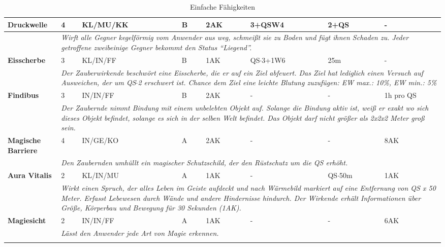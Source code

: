 \begin{longtable}{|p{4cm}|p{0.8cm}|p{2.2cm}|p{0.8cm}|p{0.8cm}|p{2.2cm}|p{0.8cm}|p{2.5cm}|}
\hline
\textbf{Druckwelle} & 4 & KL/MU/KK & B & 2AK & 3+QSW4 & 2+QS & - \\ \hline
\multicolumn{1}{r}{} & \multicolumn{7}{|p{13cm}|}{\textit{Wirft alle Gegner kegelförmig vom Anwender aus weg, schmeißt sie zu Boden und fügt ihnen Schaden zu. Jeder getroffene zweibeinige Gegner bekommt den Status "`Liegend"'.}} \\

\hline
\textbf{Eisscherbe} & 3 & KL/IN/FF & B & 1AK & QS$\cdot$3+1W6 & 25m & - \\ \hline
\multicolumn{1}{r}{} & \multicolumn{7}{|p{13cm}|}{\textit{Der Zauberwirkende beschwört eine Eisscherbe, die er auf ein Ziel abfeuert. Das Ziel hat lediglich einen Versuch auf Ausweichen, der um QS$\cdot$2 erschwert ist. Chance dem Ziel eine leichte Blutung zuzufügen: EW max.: 10\%, EW min.: 5\%}} \\

\hline
\textbf{Findibus} & 3 & IN/IN/FF & B & 2AK & - & - & 1h pro QS \\ \hline
\multicolumn{1}{r}{} & \multicolumn{7}{|p{13cm}|}{\textit{Der Zaubernde nimmt Bindung mit einem unbelebten Objekt auf. Solange die Bindung aktiv ist, weiß er exakt wo sich dieses Objekt befindet, solange es sich in der selben Welt befindet. Das Objekt darf nicht größer als 2x2x2 Meter groß sein.}} \\

\hline
\textbf{Magische Barriere} & 4 & IN/GE/KO & A & 2AK & - & - & 8AK \\ \hline
\multicolumn{1}{r}{} & \multicolumn{7}{|p{13cm}|}{\textit{Den Zaubernden umhüllt ein magischer Schutzschild, der den Rüstschutz um die QS erhöht.}} \\

\hline
\textbf{Aura Vitalis} & 2 & KL/IN/MU & A & 1AK & - & QS$\cdot$50m & 1AK \\ \hline
\multicolumn{1}{r}{} & \multicolumn{7}{|p{13cm}|}{\textit{Wirkt einen Spruch, der alles Leben im Geiste aufdeckt und nach Wärmebild markiert auf eine Entfernung von QS x 50 Meter. Erfasst Lebewesen durch Wände und andere Hindernisse hindurch. Der Wirkende erhält Informationen über Größe, Körperbau und Bewegung für 30 Sekunden (1AK).}} \\

\hline
\textbf{Magiesicht} & 2 & IN/IN/FF & A & 1AK & - & - & 6AK \\ \hline
\multicolumn{1}{r}{} & \multicolumn{7}{|p{13cm}|}{\textit{Lässt den Anwender jede Art von Magie erkennen.}} \\

\cline{2-8}
\caption{Einfache Fähigkeiten}
\label{tab:EinfacheSkills}
\end{longtable}


